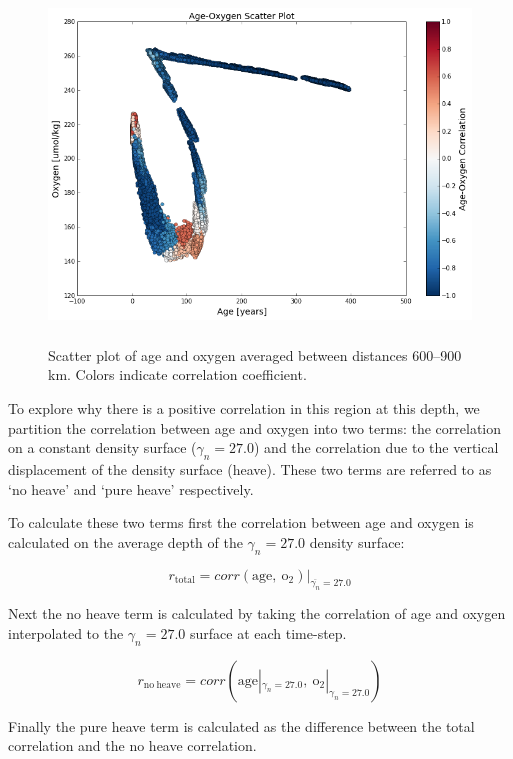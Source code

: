 \documentclass[11pt]{article}
\begin{document}
\begin{figure}[t!]
    \centering
    \includegraphics[height=3.7in]{Age-Oxygen_scatter.png}
    \caption{Scatter plot of age and oxygen averaged between distances 600--900
    km. Colors indicate correlation coefficient.}
\end{figure}

To explore why there is a positive correlation in this region at this depth, we
partition the correlation between age and oxygen into two terms: the correlation
on a constant density surface ($\gamma_n = 27.0$) and the correlation due to the
vertical displacement of the density surface (heave). These two terms are referred to
as `no heave' and `pure heave' respectively.

To calculate these two terms first the correlation between age and oxygen is calculated
on the average depth of the $\gamma_n = 27.0$ density surface:

\begin{equation}
r_{\mathrm{total}} = corr(\mathrm{age},\: \mathrm{o_2})\bigg\vert_{\overline{\gamma_n}=27.0}
\end{equation}

Next the no heave term is calculated by taking the correlation of age and oxygen
interpolated to the $\gamma_n = 27.0$ surface at each time-step.

\begin{equation}
r_{\mathrm{no\ heave}} = corr(\mathrm{age}|_{\gamma_n = 27.0},\: \mathrm{o_2}|_{\gamma_n = 27.0})
\end{equation}

Finally the pure heave term is calculated as the difference between the total
correlation and the no heave correlation.
\end{document}
